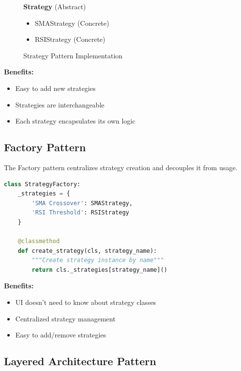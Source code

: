 \documentclass[11pt,a4paper]{article}
\begin{document}
\begin{figure}[H]
\centering
\begin{minipage}{0.6\textwidth}
\textbf{Strategy} (Abstract)
\begin{itemize}[leftmargin=2em]
    \item SMAStrategy (Concrete)
    \item RSIStrategy (Concrete)
\end{itemize}
\end{minipage}
\caption{Strategy Pattern Implementation}
\end{figure}

\textbf{Benefits:}
\begin{itemize}[noitemsep]
    \item Easy to add new strategies
    \item Strategies are interchangeable
    \item Each strategy encapsulates its own logic
\end{itemize}

\subsection{Factory Pattern}

The Factory pattern centralizes strategy creation and decouples it from usage.

\begin{lstlisting}[language=Python, caption=Factory Pattern Example]
class StrategyFactory:
    _strategies = {
        'SMA Crossover': SMAStrategy,
        'RSI Threshold': RSIStrategy
    }
    
    @classmethod
    def create_strategy(cls, strategy_name):
        """Create strategy instance by name"""
        return cls._strategies[strategy_name]()
\end{lstlisting}

\textbf{Benefits:}
\begin{itemize}[noitemsep]
    \item UI doesn't need to know about strategy classes
    \item Centralized strategy management
    \item Easy to add/remove strategies
\end{itemize}

\subsection{Layered Architecture Pattern}
\end{document}
